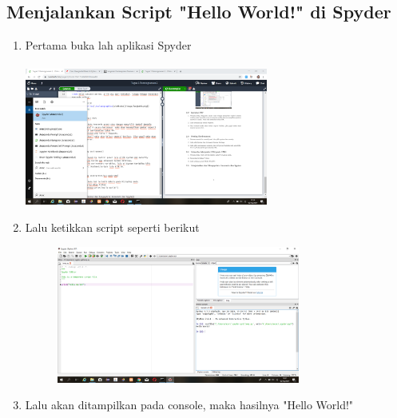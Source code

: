 \documentclass{article}
\begin{document}
\subsection{Menjalankan Script "Hello World!" di Spyder}
\begin{enumerate}
    \item Pertama buka lah aplikasi Spyder
    \paragraph{}
            \centerline{\includegraphics[width=8cm]{image/spyder.png}}
    \item Lalu ketikkan script seperti berikut
        \begin{figure}[h]
            \centerline{\includegraphics[width=8cm]{image/helloworld.png}}
        \end{figure}
    \item Lalu akan ditampilkan pada console, maka hasilnya "Hello World!"
\end{enumerate}
\end{document}
